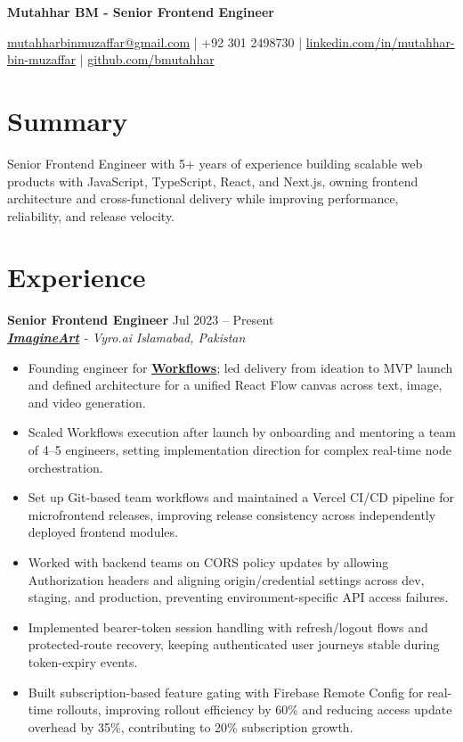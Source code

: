 \documentclass[9pt,letterpaper]{article}
\newcommand{\resumeHeader}[1]{%
  \begin{center}
    \vspace{1pt}
    {\fontsize{18pt}{20pt}\selectfont\bfseries #1\par}
    \vspace{2pt}
  \end{center}
}
\newcommand{\role}[4]{\textbf{#1} \hfill #2 \\
\textit{#3} \hfill \textit{#4}\\[-5pt]}
\begin{document}
\resumeHeader{Mutahhar BM - Senior Frontend Engineer}
\begin{center}
\fontsize{9pt}{11pt}\selectfont
\href{mailto:mutahharbinmuzaffar@gmail.com}{mutahharbinmuzaffar@gmail.com} \;|\; +92 301 2498730 \;|\;
\href{https://www.linkedin.com/in/mutahhar-bin-muzaffar}{linkedin.com/in/mutahhar-bin-muzaffar} \;|\;
\href{https://github.com/bmutahhar}{github.com/bmutahhar}
\end{center}

\section*{Summary}
Senior Frontend Engineer with 5+ years of experience building scalable web products with JavaScript, TypeScript, React, and Next.js, owning frontend architecture and cross-functional delivery while improving performance, reliability, and release velocity.

\section*{Experience}
\role{Senior Frontend Engineer}{Jul 2023 -- Present}{\href{https://www.imagine.art/}{\textbf{\underline{ImagineArt}}} - Vyro.ai}{Islamabad, Pakistan}
\begin{itemize}[leftmargin=*, itemsep=0pt, topsep=0pt, partopsep=0pt, parsep=0pt, after=\vspace{2pt}]
  \item Founding engineer for \href{https://www.imagine.art/flow}{\textbf{\underline{Workflows}}}; led delivery from ideation to MVP launch and defined architecture for a unified React Flow canvas across text, image, and video generation.
  \item Scaled Workflows execution after launch by onboarding and mentoring a team of 4--5 engineers, setting implementation direction for complex real-time node orchestration.
  \item Set up Git-based team workflows and maintained a Vercel CI/CD pipeline for microfrontend releases, improving release consistency across independently deployed frontend modules.
  \item Worked with backend teams on CORS policy updates by allowing Authorization headers and aligning origin/credential settings across dev, staging, and production, preventing environment-specific API access failures.
  \item Implemented bearer-token session handling with refresh/logout flows and protected-route recovery, keeping authenticated user journeys stable during token-expiry events.
  \item Built subscription-based feature gating with Firebase Remote Config for real-time rollouts, improving rollout efficiency by 60\% and reducing access update overhead by 35\%, contributing to 20\% subscription growth.
\end{itemize}
\end{document}
